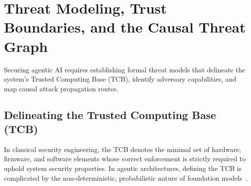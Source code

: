 \section{Threat Modeling, Trust Boundaries, and the Causal Threat Graph}
\label{sec:threat_model}

Securing agentic AI requires establishing formal threat models that delineate the system's Trusted Computing Base (TCB), identify adversary capabilities, and map causal attack propagation routes.

\subsection{Delineating the Trusted Computing Base (TCB)}
\label{subsec:tcb}

In classical security engineering, the TCB denotes the minimal set of hardware, firmware, and software elements whose correct enforcement is strictly required to uphold system security properties. In agentic architectures, defining the TCB is complicated by the non-deterministic, probabilistic nature of foundation models~\cite{dehghantanha2026sok, verma2024operationalizing}. 

